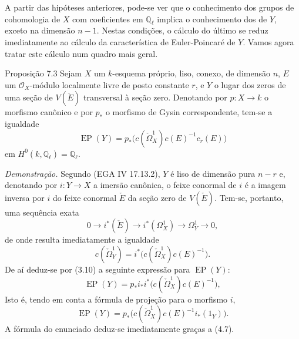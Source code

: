 A partir das hipóteses anteriores, pode-se ver que o conhecimento dos grupos de cohomologia de $X$ com coeficientes em $\mathbb Q_\ell$ implica o conhecimento dos de $Y$, exceto na dimensão $n-1$. Nestas condições, o cálculo do último se reduz imediatamente ao cálculo da característica de Euler-Poincaré de $Y$. Vamos agora tratar este cálculo num quadro mais geral.

\begin{statement}{Proposição 7.3}
Sejam $X$ um $k$-esquema próprio, liso, conexo, de dimensão $n$, $E$ um $\mathcal O_X$-módulo localmente livre de posto constante $r$, e $Y$ o lugar dos zeros de uma seção de $V(\check E)$ transversal à seção zero. Denotando por $p:X\to k$ o morfismo canônico e por $p_*$ o morfismo de Gysin correspondente, tem-se a igualdade
\[
\operatorname{EP}(Y)=p_*\bigl(c(\check\Omega_X^1)c(E)^{-1}c_r(E)\bigr)
\]
em $H^0(k,\mathbb Q_\ell)=\mathbb Q_\ell$.
\end{statement}

\emph{Demonstração.} Segundo (EGA IV 17.13.2), $Y$ é liso de dimensão pura $n-r$ e, denotando por $i:Y\to X$ a imersão canônica, o feixe conormal de $i$ é a imagem inversa por $i$ do feixe conormal $\check E$ da seção zero de $V(\check E)$. Tem-se, portanto, uma sequência exata
\[
0\to i^*(\check E)\to i^*(\Omega_X^1)\to\Omega_Y^1\to0,
\tag{7.3.1}
\]
de onde resulta imediatamente a igualdade
\[
c(\check\Omega_Y^1)=i^*\bigl(c(\check\Omega_X^1)c(E)^{-1}\bigr).
\tag{7.3.2}
\]
De aí deduz-se por (3.10) a seguinte expressão para $\operatorname{EP}(Y)$:
\[
\operatorname{EP}(Y)=p_*i_*i^*\bigl(c(\check\Omega_X^1)c(E)^{-1}\bigr),
\]
Isto é, tendo em conta a fórmula de projeção para o morfismo $i$,
\[
\operatorname{EP}(Y)=p_*\bigl(c(\check\Omega_X^1)c(E)^{-1}i_*(1_Y)\bigr).
\]
A fórmula do enunciado deduz-se imediatamente graças a (4.7).
